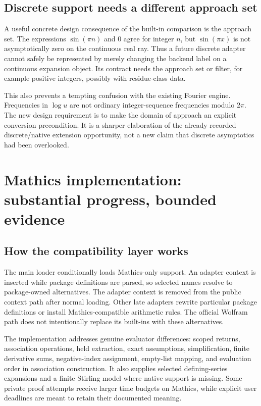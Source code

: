 \documentclass[11pt,letterpaper]{article}
\begin{document}
\subsection{Discrete support needs a different approach set}

A useful concrete design consequence of the built-in comparison is the approach set. The expressions $\sin(\pi n)$ and $0$ agree for integer $n$, but $\sin(\pi x)$ is not asymptotically zero on the continuous real ray. Thus a future discrete adapter cannot safely be represented by merely changing the backend label on a continuous expansion object. Its contract needs the approach set or filter, for example positive integers, possibly with residue-class data.

This also prevents a tempting confusion with the existing Fourier engine. Frequencies in $\log u$ are not ordinary integer-sequence frequencies modulo $2\pi$. The new design requirement is to make the domain of approach an explicit conversion precondition. It is a sharper elaboration of the already recorded discrete/native extension opportunity, not a new claim that discrete asymptotics had been overlooked.~\cite{wl-discrete,register,fourier}

\section{Mathics implementation: substantial progress, bounded evidence}

\subsection{How the compatibility layer works}

The main loader conditionally loads Mathics-only support. An adapter context is inserted while package definitions are parsed, so selected names resolve to package-owned alternatives. The adapter context is removed from the public context path after normal loading. Other late adapters rewrite particular package definitions or install Mathics-compatible arithmetic rules. The official Wolfram path does not intentionally replace its built-ins with these alternatives.~\cite{core,mathics-compat,mathics-lists,mathics-core}

The implementation addresses genuine evaluator differences: scoped returns, association operations, held extraction, exact assumptions, simplification, finite derivative sums, negative-index assignment, empty-list mapping, and evaluation order in association construction. It also supplies selected defining-series expansions and a finite Stirling model where native support is missing. Some private proof attempts receive larger time budgets on Mathics, while explicit user deadlines are meant to retain their documented meaning.~\cite{compat,mathics-compat,mathics-simplify,mathics-special}
\end{document}
